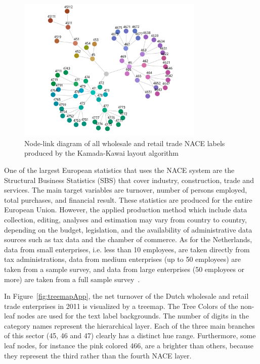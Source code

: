 \documentclass[review,journal]{vgtc}         %
\begin{document}
\begin{figure}[!b]
  \centering
  \includegraphics[width=3.5in]{Gbusiness_KK.pdf}
  \caption{Node-link diagram of all wholesale and retail trade NACE labels produced by the Kamada-Kawai layout algorithm}\label{fig:graphKKApp}
\end{figure}

One of the largest European statistics that uses the NACE system are the Structural Business Statistics (SBS) that cover industry, construction, trade and services. The main target variables are turnover, number of persons employed, total purchases, and financial result. These statistics are produced for the entire European Union. However, the applied production method which include data collection, editing, analyses and estimation may vary from country to country, depending on the budget, legislation, and the availability of administrative data sources such as tax data and the chamber of commerce. As for the Netherlands, data from small enterprises, i.e. less than 10 employees, are taken directly from tax administrations, data from medium enterprises (up to 50 employees) are taken from a sample survey, and data from large enterprises (50 employees or more) are taken from a full sample survey~\cite{cbsSBS}.


In Figure~\ref{fig:treemapApp}, the net turnover of the Dutch wholesale and retail trade enterprises in 2011 is visualized by a treemap. The Tree Colors of the non-leaf nodes are used for the text label backgrounds. The number of digits in the category names represent the hierarchical layer. Each of the three main branches of this sector (45, 46 and 47) clearly has a distinct hue range. Furthermore, some leaf nodes, for instance the pink colored 466, are a brighter than others, because they represent the third rather than the fourth NACE layer.
\end{document}
